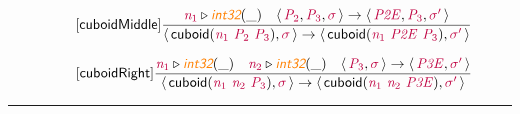 \documentclass[10pt,leqno,fleqn]{article}
\newcommand{\artVariable}[1]{\mbox{\color{purple}\em #1\/}}
\newcommand{\artConstructor}[1]{\mbox{\sf #1}}
\newcommand{\artSpecial}[1]{\mbox{\color{orange}\sf\em #1}}
\begin{document}
\begin{equation}
\tag*{[\artConstructor{\sf cuboidMiddle}]}
\begin{split}\frac{ \artVariable{n$_{1}$}\triangleright \artSpecial{int32}(\_) \quad \langle\, \artVariable{P$_{2}$}, \artVariable{P$_{3}$}, \artVariable{$\sigma$}\,\rangle \rightarrow \langle\, \artVariable{P2E}, \artVariable{P$_{3}$}, \artVariable{$\sigma$\/$^\prime$}\,\rangle }{\langle\, \artConstructor{\sf cuboid}(\artVariable{n$_{1}$}\ \artVariable{P$_{2}$}\ \artVariable{P$_{3}$}), \artVariable{$\sigma$}\,\rangle \rightarrow \langle\, \artConstructor{\sf cuboid}(\artVariable{n$_{1}$}\ \artVariable{P2E}\ \artVariable{P$_{3}$}), \artVariable{$\sigma$\/$^\prime$}\,\rangle }
\end{split}
\end{equation}

\begin{equation}
\tag*{[\artConstructor{\sf cuboidRight}]}
\begin{split}\frac{ \artVariable{n$_{1}$}\triangleright \artSpecial{int32}(\_) \quad  \artVariable{n$_{2}$}\triangleright \artSpecial{int32}(\_) \quad \langle\, \artVariable{P$_{3}$}, \artVariable{$\sigma$}\,\rangle \rightarrow \langle\, \artVariable{P3E}, \artVariable{$\sigma$\/$^\prime$}\,\rangle }{\langle\, \artConstructor{\sf cuboid}(\artVariable{n$_{1}$}\ \artVariable{n$_{2}$}\ \artVariable{P$_{3}$}), \artVariable{$\sigma$}\,\rangle \rightarrow \langle\, \artConstructor{\sf cuboid}(\artVariable{n$_{1}$}\ \artVariable{n$_{2}$}\ \artVariable{P3E}), \artVariable{$\sigma$\/$^\prime$}\,\rangle }
\end{split}
\end{equation}

\hrule
\end{document}
